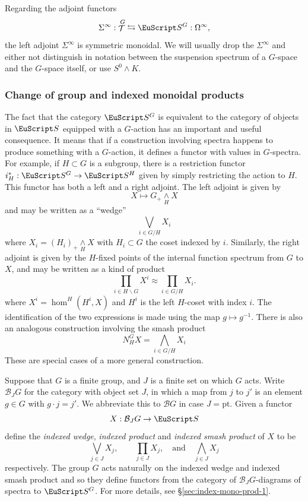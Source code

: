 \documentclass{amsart}
\theoremstyle{definition}
\theoremstyle{remark}
\newcommand{\spectra}{\EuScript S}
\DeclareMathOperator{\spaces}{\mathcal T}
\newcommand{\norm}{N}
\newcommand{\ugspaces}[1]{\spaces^{#1}}
\newcommand{\ugspectra}[1]{\spectra^{#1}}
\newcommand{\cat}[1]{{\mathcal #1}}
\begin{document}
Regarding the adjoint functors
\[
\Sigma^{\infty}:\ugspaces{G} \leftrightarrows \ugspectra{G}:
\Omega^{\infty},
\]
the left adjoint $\Sigma^{\infty}$
is symmetric monoidal.  We will usually drop the $\Sigma^{\infty}$ and
either not distinguish in notation between the suspension spectrum of
a $G$-space and the $G$-space itself, or use $S^{0}\wedge K$.


\subsubsection{Change of group and indexed monoidal products}
\label{sec:change-group-2} 

The fact that the category $\ugspectra{G}$ is equivalent to the
category of objects in $\spectra$ equipped with a $G$-action has an
important and useful consequence.  It means that if a construction
involving spectra happens to produce something with a $G$-action, it
defines a functor with values in $G$-spectra.  For example, if
$H\subset G$ is a subgroup, there is a restriction functor
$i_{H}^{\ast}:\ugspectra{G}\to \ugspectra{H}$ given by simply
restricting the action to $H$.  This functor has both a left and a
right adjoint.  The left adjoint is given by
\[
X \mapsto  G_{+}\underset{H}{\wedge}X
\]
and may be written as a ``wedge''
\[
\bigvee_{i\in G/H}X_{i}
\]
where $X_{i} = (H_{i})_{+}\underset{H}{\wedge}{X}$ with $H_{i}\subset
G$ the coset indexed by $i$.  Similarly, the right adjoint is given by
the $H$-fixed points of the internal function spectrum from $G$ to
$X$, and may be written as a kind of product 
\[
\prod_{i\in H\backslash G}X^{i} \approx
\prod_{i\in G/H}X_{i}.
\]
where $X^{i}= \hom^{H}(H^{i},X)$ and $H^{i}$ is the left $H$-coset
with index $i$.  The identification of the two expressions is made
using the map $g\mapsto g^{-1}$.  There is also an analogous
construction involving the smash product
\[
\norm_{H}^{G}X=\bigwedge_{i\in G/H}X_{i}
\]
These are special cases of a more general construction.

Suppose that $G$ is a finite group, and $J$ is a finite set on which
$G$ acts.  Write $\cat{B}_{J}G$ for the category with object set $J$,
in which a map from $j$ to $j'$ is an element $g\in G$ with $g\cdot
j=j'$.  We abbreviate this to $\cat{B}G$ in case $J=\text{pt}$.  Given
a functor
\[
X:\cat{B}_{J}G\to \spectra
\]
define the {\em indexed wedge}, {\em indexed product} and {\em indexed
smash product} of $X$ to be
\[
\bigvee_{j\in J} X_{j}, \quad\quad
\prod_{j\in J} X_{j}, \quad\text{and}\quad
\bigwedge_{j\in J}X_{j}
\]
respectively.  The group $G$ acts naturally on the indexed wedge and
indexed smash product and so they define functors from the category of
$\cat{B}_{J}G$-diagrams of spectra to $\ugspectra{G}$.  For more
details, see \S\ref{sec:index-mono-prod-1}.
\end{document}
